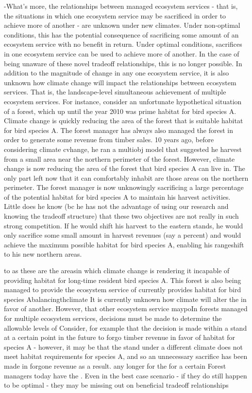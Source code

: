 -What's more, the relationships between managed ecosystem services - that is, the situations in which one ecosystem service may be sacrificed in order to achieve more of another - are unknown under new climates. Under non-optimal conditions, this has the potential consequence of sacrificing some amount of an ecosystem service with no benefit in return. Under optimal conditions, sacrifices in one ecosystem service can be used to achieve more of another. In the case of being unaware of these novel tradeoff relationships, this is no longer possible.
In addition to the magnitude of change in any one ecosystem service, it is also unknown how climate change will impact the relationships between ecosystem services. That is, the landscape-level simultaneous achievement of multiple ecosystem services.
For instance, consider an unfortunate hypothetical situation of a forest, which up until the year 2010 was prime habitat for bird species A. Climate change is quickly reducing the area of the forest that is suitable habitat for bird species A. The forest manager has always also managed the forest in order to generate some revenue from timber sales. 10 years ago, before considering climate cvhange, he ran a multiobj model that suggested he harvest from a small area near the northern perimeter of the forest. However, climate change is now reducing the area of the forest that bird species A can live in. The only part left now that it can comfortably inhabit are those areas on the northern perimeter. The forest manager is now unknowingly sacrificing a large percentage of the potential habitat for bird species A to maintain his harvest activities. Little does he know (bc he has not the advantage of using our research and knowing the tradeoff structure) that these two objectives are not really in such strong competition. If he would shift his harvest to the eastern stands, he would only sacrifice some small amount in harvest revenues (say a percent) and would achieve the maximum possible habitat for bird species A, enabling his rangeshift to his new northern areas.

 to as these are the areasin which climate change is rendering it incapable of providing habitat for long-time resident bird species A. This forest is also being managed to provide the ecosystem service of  currently provides habitat for bird species Abalancingthclimate It is currently unknown how climate will alter the 
in favor of another. However, that other ecosystem service maypoIn forests managed for multiple ecosystem services, decisions must be made to determine the allowable levels of 
Consider, for example that the decision is made within a stand at a certain point in the future to forgo timber revenue in favor of habitat for species A - however, it may be that the stand under a different climate does not meet habitat requirements for species A, and so an unnecessary sacrifice has been made in forgone revenue as a result. any longer for the for a certain Forest managers today have the . Even in the best case scenario - if they do still happen to be optimal - they may be missing out on beneficial tradeoff relationships

